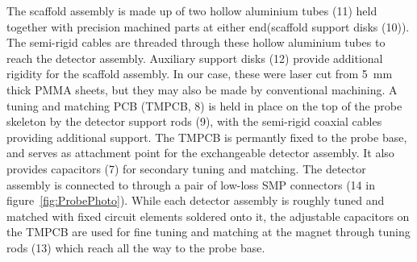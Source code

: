 \documentclass[preprint,12pt]{article}
\begin{document}
The scaffold assembly is made up of two hollow aluminium tubes (11) held together with 
precision machined parts at either end(scaffold support disks (10)). 
The semi-rigid cables are  threaded through these hollow aluminium tubes 
to reach the detector assembly. 
Auxiliary support disks (12) provide additional rigidity for the scaffold assembly. 
In our case, these were laser cut from 5~mm thick PMMA sheets, 
but they may also be made by conventional machining.
A tuning and matching PCB (TMPCB, 8) is held in place on the top of the probe skeleton by
the detector support rods (9), with the semi-rigid coaxial cables providing
additional support.
The TMPCB is permantly fixed to the probe base, and serves as attachment point
for the exchangeable detector assembly. It also provides 
capacitors (7) for secondary tuning and matching.
The detector assembly is connected to through a pair of
low-loss SMP connectors (14 in figure~\ref{fig:ProbePhoto}).
While each detector assembly is roughly
tuned and matched with fixed circuit elements soldered onto it,
the adjustable capacitors on the TMPCB are used for 
fine tuning and matching 
at the magnet through tuning rods (13) which reach all the way to the probe base. 
\end{document}
